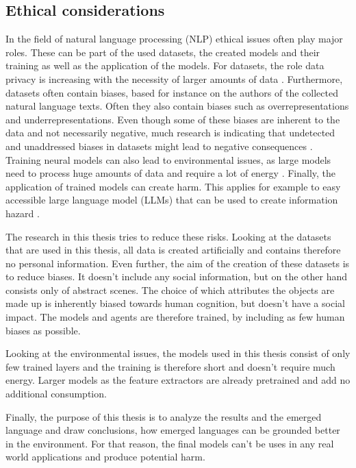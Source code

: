 \subsection{Ethical considerations}
In the field of natural language processing (NLP) ethical issues often play major roles.
These can be part of the used datasets, the created models and their training as well as the application of the models.
For datasets, the role data privacy is increasing with the necessity of larger amounts of data \citep{Klymenko2022}.
Furthermore, datasets often contain biases, based for instance on the authors of the collected natural language texts. Often they also contain biases such as overrepresentations and underrepresentations.
Even though some of these biases are inherent to the data and not necessarily negative, much research is indicating that undetected and unaddressed biases in datasets might lead to negative consequences \citep{Shah2020,Field2021,Bender2021}.
Training neural models can also lead to environmental issues, as large models need to process huge amounts of data and require a lot of energy \citep{Bender2021}.
Finally, the application of trained models can create harm.
This applies for example to easy accessible large language model (LLMs) that can be used to create information hazard \citep{Weidinger2022}.

The research in this thesis tries to reduce these risks.
Looking at the datasets that are used in this thesis, all data is created artificially and contains therefore no personal information.
Even further, the aim of the creation of these datasets is to reduce biases.
It doesn't include any social information, but on the other hand consists only of abstract scenes.
The choice of which attributes the objects are made up is inherently biased towards human cognition, but doesn't have a social impact.
The models and agents are therefore trained, by including as few human biases as possible.

Looking at the environmental issues, the models used in this thesis consist of only few trained layers and the training is therefore short and doesn't require much energy.
Larger models as the feature extractors are already pretrained and add no additional consumption.

Finally, the purpose of this thesis is to analyze the results and the emerged language and draw conclusions, how emerged languages can be grounded better in the environment.
For that reason, the final models can't be uses in any real world applications and produce potential harm.

